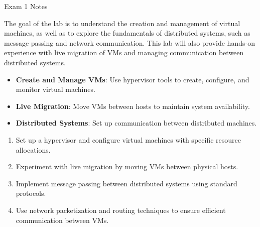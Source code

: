 \begin{examnotes}{Exam 1 Notes}
    \begin{highlight}
        The goal of the lab is to understand the creation and management of virtual machines, as well as to explore the fundamentals of distributed systems, such as message passing and network communication. 
        This lab will also provide hands-on experience with live migration of VMs and managing communication between distributed systems.
        \begin{itemize}
            \item \textbf{Create and Manage VMs}: Use hypervisor tools to create, configure, and monitor virtual machines.
            \item \textbf{Live Migration}: Move VMs between hosts to maintain system availability.
            \item \textbf{Distributed Systems}: Set up communication between distributed machines.
        \end{itemize}
    \end{highlight}
    
    \begin{highlight}
        \begin{enumerate}
            \item Set up a hypervisor and configure virtual machines with specific resource allocations.
            \item Experiment with live migration by moving VMs between physical hosts.
            \item Implement message passing between distributed systems using standard protocols.
            \item Use network packetization and routing techniques to ensure efficient communication between VMs.
        \end{enumerate}
    \end{highlight}
\end{examnotes}

